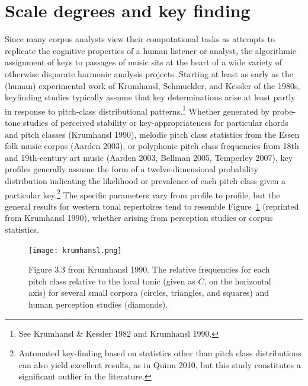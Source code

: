 \section{Scale degrees and key finding}

Since many corpus analysts view their computational tasks as attempts to replicate the cognitive properties of a human listener or analyst, the algorithmic assignment of keys to passages of music sits at the heart of a wide variety of otherwise disparate harmonic analysis projects.  Starting at least as early as the (human) experimental work of Krumhansl, Schmuckler, and Kessler of the 1980s, keyfinding studies typically assume that key determinations arise at least partly in response to pitch-class distributional patterns.\footnote{See Krumhansl \& Kessler 1982 and Krumhansl 1990.}  Whether generated by probe-tone studies of perceived stability or key-appropriateness for particular chords and pitch classes (Krumhansl 1990), melodic pitch class statistics from the Essen folk music corpus (Aarden 2003), or polyphonic pitch class frequencies from 18th and 19th-century art music (Aarden 2003, Bellman 2005, Temperley 2007), key profiles generally assume the form of a twelve-dimensional probability distribution indicating the likelihood or prevalence of each pitch class given a particular key.\footnote{Automated key-finding based on statistics other than pitch class distributions can also yield excellent results, as in Quinn 2010, but this study constitutes a significant outlier in the literature.} The specific parameters vary from profile to profile, but the general results for western tonal repertoires tend to resemble Figure~\ref{krumhansl} (reprinted from Krumhansl 1990), whether arising from perception studies or corpus statistics.

\begin{figure}%
	\centering
	\caption{Figure 3.3 from Krumhansl 1990.  The relative frequencies for each pitch class relative to the local tonic (given as $C$, on the horizontal axis) for several small corpora (circles, triangles, and squares) and human perception studies (diamonds).}
	\texttt{[image: krumhansl.png]}
	\label{krumhansl}
\end{figure}

